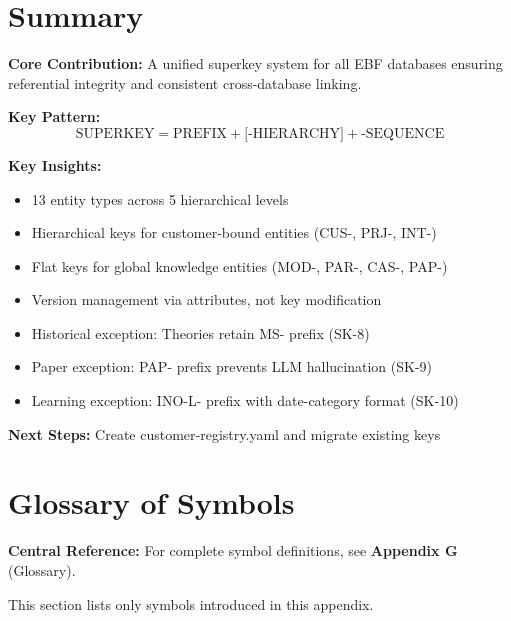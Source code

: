 \section{Summary}
\label{sec:superkey-summary}

\begin{tcolorbox}[colback=gray!5!white, colframe=gray!75!black,
    title=Appendix BN Summary: Superkey Specification]

\textbf{Core Contribution:}
A unified superkey system for all EBF databases ensuring referential integrity
and consistent cross-database linking.

\textbf{Key Pattern:}
\begin{equation}
\text{SUPERKEY} = \text{PREFIX} + \text{[-HIERARCHY]} + \text{-SEQUENCE}
\end{equation}

\textbf{Key Insights:}
\begin{itemize}[nosep]
\item 13 entity types across 5 hierarchical levels
\item Hierarchical keys for customer-bound entities (CUS-, PRJ-, INT-)
\item Flat keys for global knowledge entities (MOD-, PAR-, CAS-, PAP-)
\item Version management via attributes, not key modification
\item Historical exception: Theories retain MS- prefix (SK-8)
\item Paper exception: PAP- prefix prevents LLM hallucination (SK-9)
\item Learning exception: INO-L- prefix with date-category format (SK-10)
\end{itemize}

\textbf{Next Steps:} Create customer-registry.yaml and migrate existing keys
\end{tcolorbox}


\section{Glossary of Symbols}
\label{sec:superkey-glossary}

\begin{tcolorbox}[colback=blue!5!white, colframe=blue!75!black]
\textbf{Central Reference:} For complete symbol definitions, see
\textbf{Appendix G} (Glossary).

This section lists only symbols introduced in this appendix.
\end{tcolorbox}

